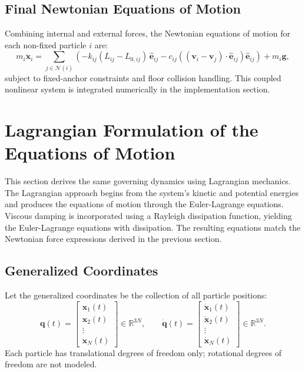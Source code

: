 \documentclass[manuscript,nonacm,12pt,letterpaper]{acmart}
\begin{document}
\subsection{Final Newtonian Equations of Motion}
\label{Sec4.5:Final}

Combining internal and external forces, the Newtonian equations of motion for each non-fixed particle $i$ are:
\begin{equation}
m_i \ddot{\mathbf{x}}_i
=
\sum_{j \in \mathcal{N}(i)}
\left(
-k_{ij}(L_{ij}-L_{0,ij})\,\hat{\mathbf{e}}_{ij}
-c_{ij}\left((\mathbf{v}_i-\mathbf{v}_j)\cdot \hat{\mathbf{e}}_{ij}\right)\hat{\mathbf{e}}_{ij}
\right)
+ m_i \mathbf{g},
\label{eq:newton_final_eom}
\end{equation}
subject to fixed-anchor constraints and floor collision handling. This coupled nonlinear system is integrated numerically in the implementation section.


\section{Lagrangian Formulation of the Equations of Motion}
\label{Sec5:Lagrangian}

This section derives the same governing dynamics using Lagrangian mechanics. The Lagrangian approach begins from the system's kinetic and potential energies and produces the equations of motion through the Euler-Lagrange equations. Viscous damping is incorporated using a Rayleigh dissipation function, yielding the Euler-Lagrange equations with dissipation. The resulting equations match the Newtonian force expressions derived in the previous section.

\subsection{Generalized Coordinates}
\label{Sec5.1:GenCoordinates}

Let the generalized coordinates be the collection of all particle positions:
\[
\mathbf{q}(t) =
\begin{bmatrix}
\mathbf{x}_1(t) \\
\mathbf{x}_2(t) \\
\vdots \\
\mathbf{x}_N(t)
\end{bmatrix}
\in \mathbb{R}^{3N},
\qquad
\dot{\mathbf{q}}(t) =
\begin{bmatrix}
\dot{\mathbf{x}}_1(t) \\
\dot{\mathbf{x}}_2(t) \\
\vdots \\
\dot{\mathbf{x}}_N(t)
\end{bmatrix}
\in \mathbb{R}^{3N}.
\]
Each particle has translational degrees of freedom only; rotational degrees of freedom are not modeled.
\end{document}
